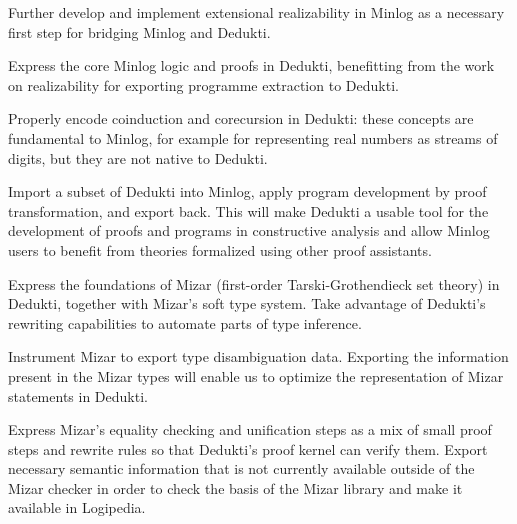 \begin{workpackage}
\begin{tasklist}
\begin{task}[id=minlog,
  title=Express the theory of Minlog in Dedukti,
  shorttitle=Minlog,
  lead=Lmu,
  LmuRM=16, %
  wphases=1-30,
  ]
  \vspace{-5mm}
  \begin{compactitem}
  \item Further develop and implement extensional realizability in Minlog as
    a necessary first step for bridging Minlog and Dedukti.
  \item Express the core Minlog logic and proofs in Dedukti, benefitting from
    the work on realizability for exporting programme extraction to Dedukti.
  \item Properly encode coinduction and corecursion in Dedukti: these concepts are
    fundamental to Minlog, for example for representing real numbers as streams of
    digits, but they are not native to Dedukti.
  \item Import a subset of Dedukti into Minlog, apply program development by proof
    transformation, and export back. This will make Dedukti a usable tool for the
    development of proofs and programs in constructive analysis and allow Minlog
    users to benefit from theories formalized using other proof assistants.
  \end{compactitem}
\end{task}

\begin{task}[id=mizar,
  title=Express the theory of Mizar in Dedukti,
  shorttitle=Mizar,
  lead=Bia,   %
  BiaRM=70, %
  InnRM=12,   %
  wphases=1-48,
  ]
  \vspace{-5mm}
  \begin{compactitem}
  \item Express the foundations of Mizar (first-order Tarski-Grothendieck set
    theory) in Dedukti, together with Mizar's soft
    type system. Take advantage of Dedukti's rewriting capabilities to automate
    parts of type inference.
  \item Instrument Mizar to export type disambiguation data. Exporting the
    information present in the Mizar types will enable us to optimize the
    representation of Mizar statements in Dedukti.
  \item Express Mizar's equality checking and unification steps as a mix of
    small proof steps and rewrite rules so that Dedukti's proof kernel can
    verify them. Export necessary semantic information that is not currently
    available outside of the Mizar checker in order to check the basis of the
    Mizar library and make it available in Logipedia.
  \end{compactitem}
\end{task}


\end{tasklist}
\end{workpackage}
